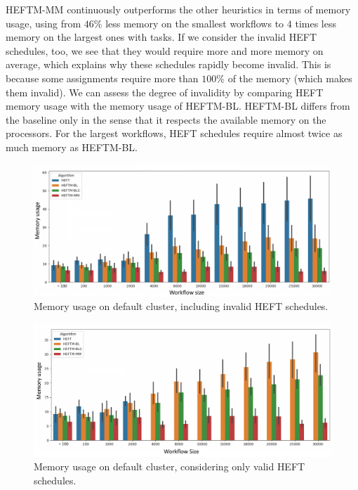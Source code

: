 \documentclass[conference]{IEEEtran}
\newcommand{\algo}[1]{\textsc{#1}}
\newcommand{\heft}{\algo{HEFT}\xspace}
\newcommand{\heftmm}{\algo{HEFTM-MM}\xspace}
\newcommand{\heftbl}{\algo{HEFTM-BL}\xspace}
\begin{document}
\heftmm continuously outperforms the other heuristics in terms of memory usage,
using from $46\%$ less memory on the smallest
workflows to $4$ times less memory on the largest ones with  tasks.
If we consider the invalid \heft schedules, too, we see that they would require more and more memory on average,
which explains why these schedules rapidly become invalid.
This is because some assignments require more than $100\%$ of the memory (which makes them invalid).
We can assess the degree of invalidity by comparing \heft memory usage with the memory usage of \heftbl.
\heftbl differs from the baseline only in the sense that it respects the available memory on the processors.
For the largest workflows, \heft schedules require almost twice as much memory as \heftbl.

\begin{figure}[tb]
    \centering
    \includegraphics[width=1\columnwidth] {images/mem-usage-normal2}
    \vspace{-0.6cm}
    \caption{Memory usage on default cluster, including invalid \heft schedules. }
     \label{fig:mem-usages-normal}
    \vspace{-0.15cm}
\end{figure}


\begin{figure}[tb]
    \centering
    \includegraphics[width=1\columnwidth] {images/mem-usage-normal-onlyvalid2}
    \vspace{-0.6cm}
    \caption{Memory usage on default cluster, considering only valid \heft schedules. }
    \label{fig:mem-usages-onlyvalid}
    \vspace{-0.15cm}
\end{figure}
\end{document}
